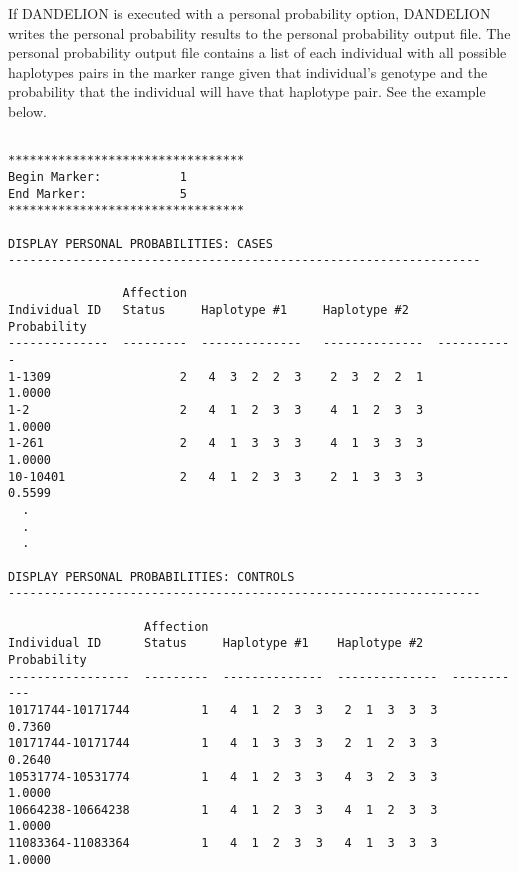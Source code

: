 If DANDELION is executed with a personal probability option, DANDELION writes
the personal probability results to the personal probability output file.  The
personal probability output file contains a list of each individual with all
possible haplotypes pairs in the marker range given that individual's genotype
and the probability that the individual will have that haplotype pair.  See the
example below.

\begin{verbatim}

*********************************
Begin Marker:           1
End Marker:             5
*********************************

DISPLAY PERSONAL PROBABILITIES: CASES
------------------------------------------------------------------

                Affection
Individual ID   Status     Haplotype #1     Haplotype #2    Probability
--------------  ---------  --------------   --------------  -----------
1-1309                  2   4  3  2  2  3    2  3  2  2  1       1.0000
1-2                     2   4  1  2  3  3    4  1  2  3  3       1.0000
1-261                   2   4  1  3  3  3    4  1  3  3  3       1.0000
10-10401                2   4  1  2  3  3    2  1  3  3  3       0.5599
  .
  .
  .

DISPLAY PERSONAL PROBABILITIES: CONTROLS
------------------------------------------------------------------

                   Affection
Individual ID      Status     Haplotype #1    Haplotype #2    Probability
-----------------  ---------  --------------  --------------  -----------
10171744-10171744          1   4  1  2  3  3   2  1  3  3  3       0.7360
10171744-10171744          1   4  1  3  3  3   2  1  2  3  3       0.2640
10531774-10531774          1   4  1  2  3  3   4  3  2  3  3       1.0000
10664238-10664238          1   4  1  2  3  3   4  1  2  3  3       1.0000
11083364-11083364          1   4  1  2  3  3   4  1  3  3  3       1.0000
\end{verbatim}

